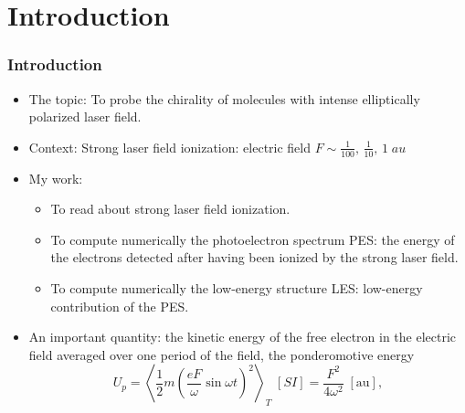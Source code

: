 \documentclass{beamer}
\begin{document}
\section{Introduction} %


\begin{frame}
\frametitle{Introduction}
\begin{itemize}
\item
The topic: To probe the chirality of molecules with intense elliptically polarized laser field. \\
\item
Context: Strong laser field ionization: electric field $F\sim \frac{1}{100},\, \frac{1}{10},\, 1 \; au$ \\
\item
My work: 
\begin{itemize}
\item
To read about strong laser field ionization.
\item
To compute numerically the photoelectron spectrum PES: the energy of the electrons detected after having been ionized by the strong laser field.
\item
To compute numerically the low-energy structure LES: low-energy contribution of the PES.
\end{itemize}
\item
An important quantity: the kinetic energy of the free electron in the electric field averaged over one period of the field, the ponderomotive energy
\begin{equation}
U_{p}=\left< \frac{1}{2}m \left(\frac{eF}{\omega}\sin{\omega t} \right)^{2} \right>_{T} \; [SI] = \frac{F^{2}}{4\omega^{2}} \; [\text{au}],
\end{equation}   
\end{itemize}
\end{frame}
\end{document}
